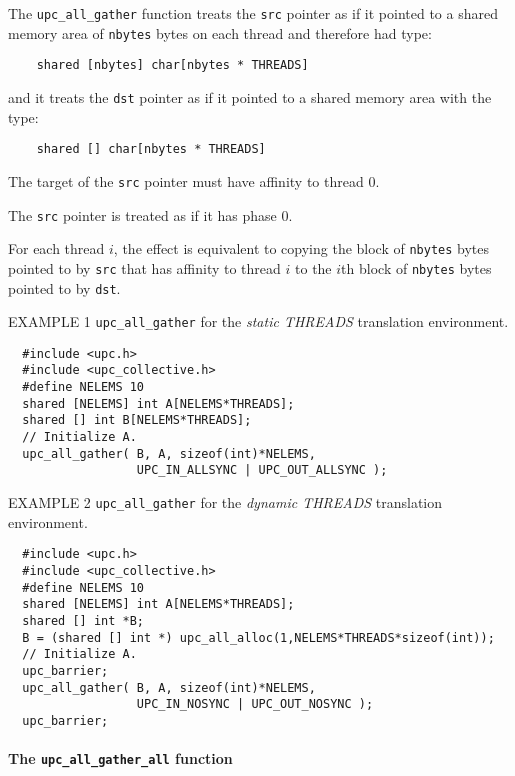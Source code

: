 \np The {\tt upc\_all\_gather} function treats the {\tt src} pointer
as if it pointed to a shared memory area of {\tt nbytes} bytes on each
thread and therefore had type:

\begin{verbatim}
    shared [nbytes] char[nbytes * THREADS]
\end{verbatim}  

\np and it treats the {\tt dst} pointer as if it pointed to a shared
memory area with the type:

\begin{verbatim}
    shared [] char[nbytes * THREADS]
\end{verbatim} 

\np The target of the {\tt src} pointer must have affinity to thread 0.

\np The {\tt src} pointer is treated as if it has phase 0.

\np For each thread $i$, the effect is equivalent to copying
the block of {\tt nbytes} bytes
pointed to by {\tt src} that has affinity to thread $i$
to the $i$th block of {\tt nbytes} bytes pointed to by {\tt dst}.

\np EXAMPLE 1 {\tt upc\_all\_gather} for the {\em static THREADS}
translation environment.

\begin{verbatim}
  #include <upc.h>
  #include <upc_collective.h>
  #define NELEMS 10
  shared [NELEMS] int A[NELEMS*THREADS];
  shared [] int B[NELEMS*THREADS];
  // Initialize A.
  upc_all_gather( B, A, sizeof(int)*NELEMS,
                  UPC_IN_ALLSYNC | UPC_OUT_ALLSYNC );
\end{verbatim}

\np EXAMPLE 2 {\tt upc\_all\_gather} for the {\em dynamic THREADS}
translation environment.

\begin{verbatim}
  #include <upc.h>
  #include <upc_collective.h>
  #define NELEMS 10
  shared [NELEMS] int A[NELEMS*THREADS];
  shared [] int *B;
  B = (shared [] int *) upc_all_alloc(1,NELEMS*THREADS*sizeof(int));
  // Initialize A.
  upc_barrier;
  upc_all_gather( B, A, sizeof(int)*NELEMS,
                  UPC_IN_NOSYNC | UPC_OUT_NOSYNC );
  upc_barrier;
\end{verbatim}

\paragraph{The {\tt upc\_all\_gather\_all} function}

